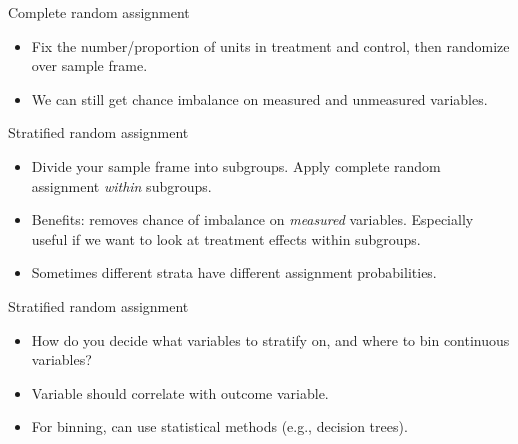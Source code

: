 \documentclass[xcolor={dvipsnames},handout]{beamer}
\begin{document}
\begin{frame}{Complete random assignment}

\begin{itemize}
\item Fix the number/proportion of units in treatment and control, then randomize over sample frame.
\item We can still get chance imbalance on measured and unmeasured variables.
\end{itemize}

\end{frame}



\begin{frame}{Stratified random assignment}

\begin{itemize}
\item Divide your sample frame into subgroups.  Apply complete random assignment \textit{within} subgroups.
\item Benefits: removes chance of imbalance on \textit{measured} variables.  Especially useful if we want to look at treatment effects within subgroups.
\item Sometimes different strata have different assignment probabilities.
\end{itemize}

\end{frame}



\begin{frame}{Stratified random assignment}

\begin{itemize}
\item How do you decide what variables to stratify on, and where to bin continuous variables?
\item Variable should correlate with outcome variable.
\item For binning, can use statistical methods (e.g., decision trees).
\end{itemize}

\end{frame}
\end{document}
